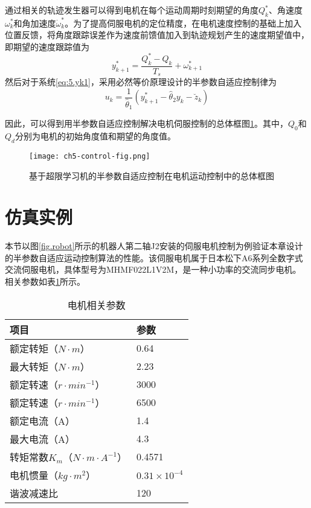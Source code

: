 通过相关的轨迹发生器可以得到电机在每个运动周期时刻期望的角度$Q_{k}^{*}$、角速度$\omega_{k}^{*}$和角加速度$\dot{\omega}_{k}^{*}$。为了提高伺服电机的定位精度，在电机速度控制的基础上加入位置反馈，将角度跟踪误差作为速度前馈值加入到轨迹规划产生的速度期望值中，即期望的速度跟踪值为
$$y_{k+1}^{*}=\frac{Q_{k}^{*}-Q_{k}}{T_{s}}+\omega_{k+1}^{*}$$
然后对于系统\ref{eq:5.yk1}，采用必然等价原理设计的半参数自适应控制律为
\begin{equation}\label{eq:5.uk}
u_{k} = \frac{1}{\hat{\theta}_{1}}(y^{*}_{k+1}-\hat{\theta}_{2}y_{k}-\breve{z}_{k})
\end{equation}

因此，可以得到用半参数自适应控制解决电机伺服控制的总体框图\ref{fig.control.motor}。其中，$Q_{0}$和$Q_{d}$分别为电机的初始角度值和期望的角度值。
\begin{figure}[!htb]
	\centering
	\texttt{[image: ch5-control-fig.png]}\\	 %
	\caption{基于超限学习机的半参数自适应控制在电机运动控制中的总体框图}
	\label{fig.control.motor}
\end{figure}

\section{仿真实例}
本节以图\ref{fig.robot}所示的机器人第二轴J2安装的伺服电机控制为例验证本章设计的半参数自适应运动控制算法的性能。该伺服电机属于日本松下A6系列全数字式交流伺服电机，具体型号为MHMF022L1V2M，是一种小功率的交流同步电机。相关参数如表\ref{tab:motor}所示。
\begin{table}
\centering
\caption{电机相关参数}\label{tab:motor}
\begin{tabular*}{0.9\textwidth}{@{\extracolsep{\fill}}ll}
\toprule
项目&参数\\
\midrule
额定转矩（$N\cdot m$）&0.64\\
最大转矩（$N\cdot m$）&2.23\\
额定转速（$r\cdot min^{-1}$）&3000\\
额定转速（$r\cdot min^{-1}$）&6500\\
额定电流（A）&1.4\\
最大电流（A）&4.3\\
转矩常数$K_{m}$（$N\cdot m\cdot A^{-1}$）& 0.4571\\
电机惯量（$kg\cdot m^{2}$）&$0.31\times10^{-4}$\\
谐波减速比&120\\
\bottomrule
\end{tabular*}
\end{table}


